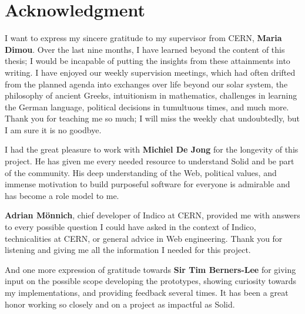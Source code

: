 \section*{Acknowledgment}

I want to express my sincere gratitude to my supervisor from CERN, \textbf{Maria Dimou}. Over the last nine months, I have learned beyond the content of this thesis; I would be incapable of putting the insights from these attainments into writing. I have enjoyed our weekly supervision meetings, which had often drifted from the planned agenda into exchanges over life beyond our solar system, the philosophy of ancient Greeks, intuitionism in mathematics, challenges in learning the German language, political decisions in tumultuous times, and much more. Thank you for teaching me so much; I will miss the weekly chat undoubtedly, but I am sure it is no goodbye.

\vspace{1cm}

I had the great pleasure to work with \textbf{Michiel De Jong} for the longevity of this project. He has given me every needed resource to understand Solid and be part of the community. His deep understanding of the Web, political values, and immense motivation to build purposeful software for everyone is admirable and has become a role model to me.

\vspace{1cm}

\textbf{Adrian M\"onnich}, chief developer of Indico at CERN, provided me with answers to every possible question I could have asked in the context of Indico, technicalities at CERN, or general advice in Web engineering. Thank you for listening and giving me all the information I needed for this project.

\vspace{1cm}

And one more expression of gratitude towards \textbf{Sir Tim Berners-Lee} for giving input on the possible scope developing the prototypes, showing curiosity towards my implementations, and providing feedback several times. It has been a great honor working so closely and on a project as impactful as Solid.
